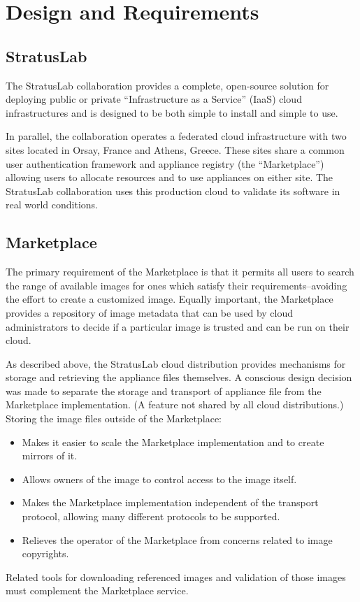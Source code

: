 \section{Design and Requirements}

\subsection{StratusLab}

The StratusLab collaboration provides a complete, open-source solution
for deploying public or private ``Infrastructure as a Service'' (IaaS)
cloud infrastructures and is designed to be both simple to install and
simple to use.~\cite{slbook}

In parallel, the collaboration operates a federated cloud
infrastructure with two sites located in Orsay, France and Athens,
Greece\@.  These sites share a common user authentication framework
and appliance registry (the ``Marketplace'') allowing users to
allocate resources and to use appliances on either site.  The
StratusLab collaboration uses this production cloud to validate its
software in real world conditions.

\subsection{Marketplace}

The primary requirement of the Marketplace is that it permits all
users to search the range of available images for ones which satisfy
their requirements--avoiding the effort to create a customized image.
Equally important, the Marketplace provides a repository of image
metadata that can be used by cloud administrators to decide if a
particular image is trusted and can be run on their cloud.

As described above, the StratusLab cloud distribution provides
mechanisms for storage and retrieving the appliance files themselves.
A conscious design decision was made to separate the storage and
transport of appliance file from the Marketplace implementation.  (A
feature not shared by all cloud distributions.)  Storing the image
files outside of the Marketplace:
\begin{itemize}
\item Makes it easier to scale the Marketplace implementation and to
  create mirrors of it.
\item Allows owners of the image to control access to the image
  itself.
\item Makes the Marketplace implementation independent of the
  transport protocol, allowing many different protocols to be
  supported.
\item Relieves the operator of the Marketplace from concerns related
  to image copyrights.
\end{itemize}
Related tools for downloading referenced images and validation of
those images must complement the Marketplace service.

